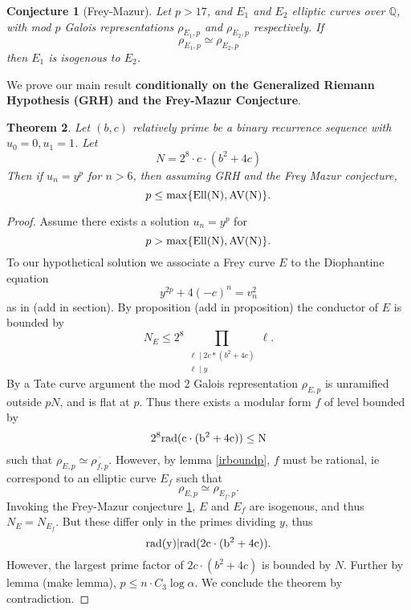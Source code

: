 \documentclass[12pt]{amsart}
\newtheorem{thm}{Theorem}[section]
\newtheorem{conj}[thm]{Conjecture}
\theoremstyle{definition}
\def\Q{{\mathbb Q}}
\newcommand{\rad}{\rm rad}
\renewcommand{\bar}{\overline}
\newcommand{\Ell}{\rm Ell}
\newcommand{\AV}{\rm AV}
\begin{document}
\begin{conj}[Frey-Mazur]\label{FreyMazur}
Let $p > 17$, and $E_1$ and $E_2$ elliptic curves over $\Q$, with mod $p$ Galois representations $\rho_{E_1,p}$ and $\rho_{E_2,p}$ respectively.  If
\[ \rho_{E_1,p} \simeq \rho_{E_2,p} \]
then $E_1$ is isogenous to $E_2$.
\end{conj}


We prove our main result \textbf{conditionally on the Generalized Riemann Hypothesis (GRH) and the Frey-Mazur Conjecture}.


\begin{thm}\label{condbound}
Let $(b,c)$ relatively prime be a binary recurrence sequence with $u_0=0,u_1=1$.  Let 
\[ N = 2^8 \cdot c \cdot (b^2+4c) \]
Then if $u_n = y^p$ for $n> 6$, then assuming GRH and the Frey Mazur conjecture,
\[ p \leq \max\{ \Ell(N), \AV(N) \}. \]
\end{thm}

\begin{proof}
Assume there exists a solution $u_n = y^p$ for 
\[ p > \max\{ \Ell(N), \AV(N) \}. \]
To our hypothetical solution we associate a Frey curve $E$ to the Diophantine equation
\[ y^{2p} +4(-c)^n = v_n^2 \]
as in (add in section).  By proposition (add in proposition) the conductor of $E$ is bounded by
\[ N_E \leq 2^8 \prod_{\substack{ \ell \mid 2c*(b^2+4c) \\ \ell \mid y}} \ell. \]
By a Tate curve argument the mod $2$ Galois representation $\rho_{E,p}$ is unramified outside $pN$, and is flat at $p$.  Thus there exists a modular form $f$ of level bounded by 
\[ 2^8 \rad(c \cdot (b^2+4c)) \leq N \]
such that $\rho_{E,p} \simeq \bar{\rho_{f,p}} $.  However, by lemma \ref{irboundp}, $f$ must be rational, ie correspond to an elliptic curve $E_f$ such that
\[ \rho_{E,p} \simeq \rho_{E_f,p}. \]  
Invoking the Frey-Mazur conjecture \ref{FreyMazur}, $E$ and $E_f$ are isogenous, and thus $N_E = N_{E_f}$.  But these differ only in the primes dividing $y$, thus
\[ \rad(y) | \rad(2c \cdot (b^2+4c)). \]
However, the largest prime factor of $2c \cdot (b^2+4c)$ is bounded by $N$.  Further by lemma (make lemma), $p \leq n \cdot C_3\log{\alpha}$.  We conclude the theorem by contradiction.
\end{proof}
\end{document}
